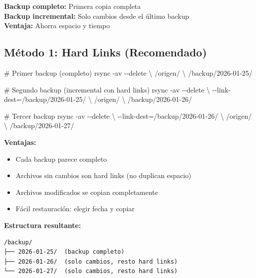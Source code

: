 \documentclass[
  doc,
  floatsintext,
  longtable,
  a4paper,
  nolmodern,
  notxfonts,
  notimes,
  12pt,
  colorlinks=true,linkcolor=blue,citecolor=blue,urlcolor=blue]{apa7}
\newenvironment{Shaded}{\begin{snugshade}}{\end{snugshade}}
\newcommand{\AttributeTok}[1]{\textcolor[rgb]{0.40,0.45,0.13}{#1}}
\newcommand{\CommentTok}[1]{\textcolor[rgb]{0.37,0.37,0.37}{#1}}
\newcommand{\DataTypeTok}[1]{\textcolor[rgb]{0.68,0.00,0.00}{#1}}
\newcommand{\FunctionTok}[1]{\textcolor[rgb]{0.28,0.35,0.67}{#1}}
\newcommand{\NormalTok}[1]{\textcolor[rgb]{0.00,0.23,0.31}{#1}}
\newcommand{\OperatorTok}[1]{\textcolor[rgb]{0.37,0.37,0.37}{#1}}
\providecommand{\tightlist}{%
  \setlength{\itemsep}{0pt}\setlength{\parskip}{0pt}}
\begin{document}
\textbf{Backup completo:} Primera copia completa\\
\textbf{Backup incremental:} Solo cambios desde el último backup\\
\textbf{Ventaja:} Ahorra espacio y tiempo

\subsection{Método 1: Hard Links
(Recomendado)}\label{muxe9todo-1-hard-links-recomendado}

\begin{Shaded}
\begin{Highlighting}[]
\CommentTok{\# Primer backup (completo)}
\FunctionTok{rsync} \AttributeTok{{-}av} \AttributeTok{{-}{-}delete} \DataTypeTok{\textbackslash{}}
\NormalTok{  /origen/ }\DataTypeTok{\textbackslash{}}
\NormalTok{  /backup/2026{-}01{-}25/}

\CommentTok{\# Segundo backup (incremental con hard links)}
\FunctionTok{rsync} \AttributeTok{{-}av} \AttributeTok{{-}{-}delete} \DataTypeTok{\textbackslash{}}
  \AttributeTok{{-}{-}link{-}dest}\OperatorTok{=}\NormalTok{/backup/2026{-}01{-}25/ }\DataTypeTok{\textbackslash{}}
\NormalTok{  /origen/ }\DataTypeTok{\textbackslash{}}
\NormalTok{  /backup/2026{-}01{-}26/}

\CommentTok{\# Tercer backup}
\FunctionTok{rsync} \AttributeTok{{-}av} \AttributeTok{{-}{-}delete} \DataTypeTok{\textbackslash{}}
  \AttributeTok{{-}{-}link{-}dest}\OperatorTok{=}\NormalTok{/backup/2026{-}01{-}26/ }\DataTypeTok{\textbackslash{}}
\NormalTok{  /origen/ }\DataTypeTok{\textbackslash{}}
\NormalTok{  /backup/2026{-}01{-}27/}
\end{Highlighting}
\end{Shaded}

\textbf{Ventajas:}

\begin{itemize}
\tightlist
\item
  Cada backup parece completo
\item
  Archivos sin cambios son hard links (no duplican espacio)
\item
  Archivos modificados se copian completamente
\item
  Fácil restauración: elegir fecha y copiar
\end{itemize}

\textbf{Estructura resultante:}

\begin{verbatim}
/backup/
├── 2026-01-25/  (backup completo)
├── 2026-01-26/  (solo cambios, resto hard links)
└── 2026-01-27/  (solo cambios, resto hard links)
\end{verbatim}
\end{document}
